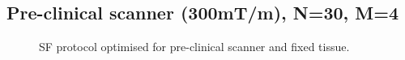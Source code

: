 \begin{subappendices}
{    \subsection{Pre-clinical scanner (300mT/m), N=30, M=4}
    \label{app:chapter7 protocols 300mT}	
    \begin{figure}
    	[H] \centering  \caption{SF protocol optimised for pre-clinical scanner and fixed tissue.} \label{fig:chapter7 exp1 FREEDIRS_300mT}
    \end{figure}
}
\end{subappendices}
